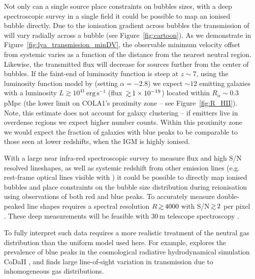 \documentclass[fleqn,usenatbib]{mnras}
\begin{document}
Not only can a single source place constraints on bubbles sizes, with a deep spectroscopic survey in a single field it could be possible to map an ionised bubble directly. Due to the ionisation gradient across bubbles the transmission of \lya will vary radially across a bubble (see Figure~\ref{fig:cartoon}). As we demonstrate in Figure~\ref{fig:lya_transmission_minDV}, the observable minimum velocity offset from systemic varies as a function of the distance from the nearest neutral region. Likewise, the transmitted \lya flux will decrease for sources further from the center of bubbles. 
If the faint-end of \lya luminosity function is steep \citep[e.g., $\alpha\sim-2.8$][]{Drake2017} at $z\sim7$, using the luminosity function model by \citet{Gronke2015} (setting $\alpha=-2.8$) we expect $\sim 12$ \lya emitting galaxies with a luminosity $L\gtrsim 10^{41}\,\mathrm{erg}\,\mathrm{s}^{-1}$ (flux $\simgt 1\times10^{-19}$\fdens) located within $R_\alpha \sim 0.3\,$pMpc (the lower limit on COLA1's proximity zone -- see Figure~\ref{fig:R_HII}). Note, this estimate does not account for galaxy clustering -- if \lya emitters live in overdense regions \citep{Ouchi2017} we expect higher number counts. Within this proximity zone we would expect the fraction of galaxies with blue \lya peaks to be comparable to those seen at lower redshifts, when the IGM is highly ionised. 

With a large near infra-red spectroscopic survey to measure \lya flux and high S/N resolved lineshapes, as well as systemic redshift from other emission lines (e.g. rest-frame optical lines visible with \JWST) it could be possible to directly map ionised bubbles and place constraints on the bubble size distribution during reionisation using observations of both red and blue peaks. To accurately measure double-peaked \lya line shapes requires a spectral resolution $R\simgt4000$ with S/N$\simgt2$ per pixel \citep[e.g.,][]{Verhamme2015}. These deep measurements will be feasible with 30\,m telescope spectroscopy \citep[e.g., E-ELT/MOSAIC is expected to reach $1\times10^{-19}$\fdens in 40 hrs,][]{Evans2015}.

To fully interpret such data requires a more realistic treatment of the neutral gas distribution than the uniform model used here. For example, \citep{Gronke2020} explores the prevalence of blue \lya peaks in the cosmological radiative hydrodynamical simulation CoDaII \citep{Ocvirk2018}, and finds large line-of-sight variation in \lya transmission due to inhomogeneous gas distributions.
\end{document}
